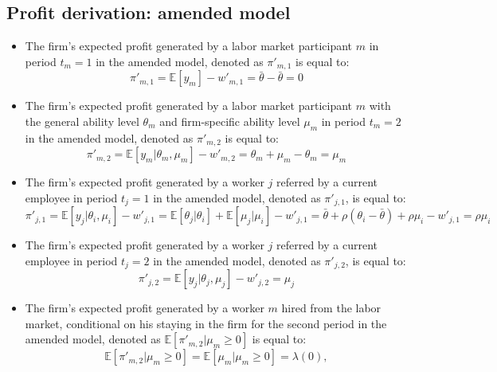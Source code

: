\documentclass[12pt]{article}
\begin{document}
\subsection*{Profit derivation: amended model}
\begin{itemize}
    \item The firm's expected profit generated by a labor market participant $m$ in period $t_m = 1$ in the amended model, denoted as $\pi'_{m,1}$ is equal to:
    \begin{equation*}
        \pi'_{m,1} = \mathbb{E}[y_m] - w'_{m,1} = \bar{\theta}-\bar{\theta} = 0
    \end{equation*}
    \item The firm's expected profit generated by a labor market participant $m$ with the general ability level $\theta_m$ and firm-specific ability level $\mu_m$ in period $t_m = 2$ in the amended model, denoted as $\pi'_{m,2}$ is equal to:
    \begin{equation*}
        \pi'_{m,2} = \mathbb{E}[y_m | \theta_m, \mu_m] - w'_{m,2} = \theta_m + \mu_m - \theta_m = \mu_m
    \end{equation*}
    \item The firm's expected profit generated by a worker $j$ referred by a current employee in period $t_j = 1$ in the amended model, denoted as $\pi'_{j,1}$, is equal to:
    \begin{equation*}
        \pi'_{j,1} = \mathbb{E}[y_j | \theta_i, \mu_i] - w'_{j,1} = \mathbb{E}[\theta_j|\theta_i] + \mathbb{E}[\mu_j|\mu_i] -w'_{j,1} = \bar{\theta} + \rho (\theta_i - \bar{\theta}) + \rho\mu_i - w'_{j,1} = \rho\mu_i
    \end{equation*}
    \item The firm's expected profit generated by a worker $j$ referred by a current employee in period $t_j = 2$ in the amended model, denoted as $\pi'_{j,2}$, is equal to:
    \begin{equation*}
        \pi'_{j,2} = \mathbb{E}[y_j | \theta_j, \mu_j] - w'_{j,2} = \mu_j
    \end{equation*}
    \item The firm's expected profit generated by a worker $m$ hired from the labor market, conditional on his staying in the firm for the second period in the amended model, denoted as $\mathbb{E}[\pi'_{m,2} | \mu_m \geq 0]$ is equal to: %
    \begin{equation*}
        \mathbb{E}[\pi'_{m,2} | \mu_m \geq 0] = \mathbb{E}[\mu_m | \mu_m \geq 0] = \lambda(0),

\end{equation*}
\end{itemize}
\end{document}
